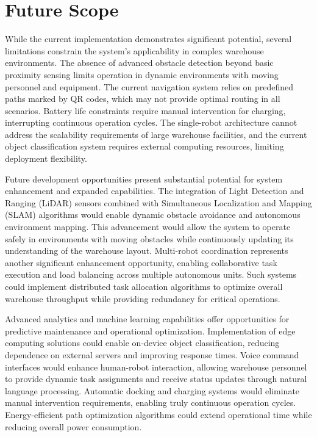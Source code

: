 \section{Future Scope}

While the current implementation demonstrates significant potential, several limitations constrain the system's applicability in complex warehouse environments. The absence of advanced obstacle detection beyond basic proximity sensing limits operation in dynamic environments with moving personnel and equipment. The current navigation system relies on predefined paths marked by QR codes, which may not provide optimal routing in all scenarios. Battery life constraints require manual intervention for charging, interrupting continuous operation cycles. The single-robot architecture cannot address the scalability requirements of large warehouse facilities, and the current object classification system requires external computing resources, limiting deployment flexibility.

Future development opportunities present substantial potential for system enhancement and expanded capabilities. The integration of Light Detection and Ranging (LiDAR) sensors combined with Simultaneous Localization and Mapping (SLAM) algorithms would enable dynamic obstacle avoidance and autonomous environment mapping. This advancement would allow the system to operate safely in environments with moving obstacles while continuously updating its understanding of the warehouse layout. Multi-robot coordination represents another significant enhancement opportunity, enabling collaborative task execution and load balancing across multiple autonomous units. Such systems could implement distributed task allocation algorithms to optimize overall warehouse throughput while providing redundancy for critical operations.

Advanced analytics and machine learning capabilities offer opportunities for predictive maintenance and operational optimization. Implementation of edge computing solutions could enable on-device object classification, reducing dependence on external servers and improving response times. Voice command interfaces would enhance human-robot interaction, allowing warehouse personnel to provide dynamic task assignments and receive status updates through natural language processing. Automatic docking and charging systems would eliminate manual intervention requirements, enabling truly continuous operation cycles. Energy-efficient path optimization algorithms could extend operational time while reducing overall power consumption.

